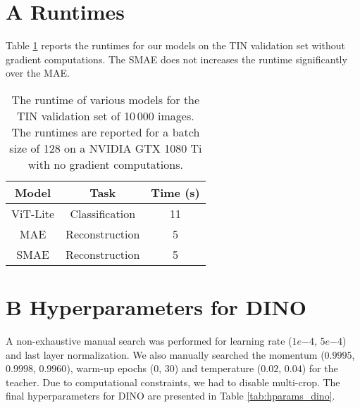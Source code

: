 \section*{A Runtimes}
\label{app: A}
Table \ref{tab:runtime} reports the runtimes for our models on the TIN validation set without gradient computations. The SMAE does not increases the runtime significantly over the MAE.

\begin{table}[H]
\centering
\begin{tabular}{@{}c|c|c@{}}
\toprule
\textbf{Model} & \textbf{Task}  & \textbf{Time (s)} \\ \midrule
ViT-Lite       & Classification & 11                \\
MAE            & Reconstruction & 5                 \\
SMAE           & Reconstruction & 5                  \\ \bottomrule
\end{tabular}
\caption{The runtime of various models for the TIN validation set of 10\,000 images. The runtimes are reported for a batch size of 128 on a NVIDIA GTX 1080 Ti with no gradient computations.}
\label{tab:runtime}
\end{table}

\section*{B Hyperparameters for DINO}
\label{app: B}
A non-exhaustive manual search was performed for learning rate ($1e{-4}$, $5e{-4}$) and last layer normalization. We also manually searched the momentum ($0.9995$, $0.9998$, $0.9960$), warm-up epochs ($0$, $30$) and temperature ($0.02$, $0.04$) for the teacher. Due to computational constraints, we had to disable multi-crop. The final hyperparameters for DINO are presented in Table \ref{tab:hparams_dino}.

